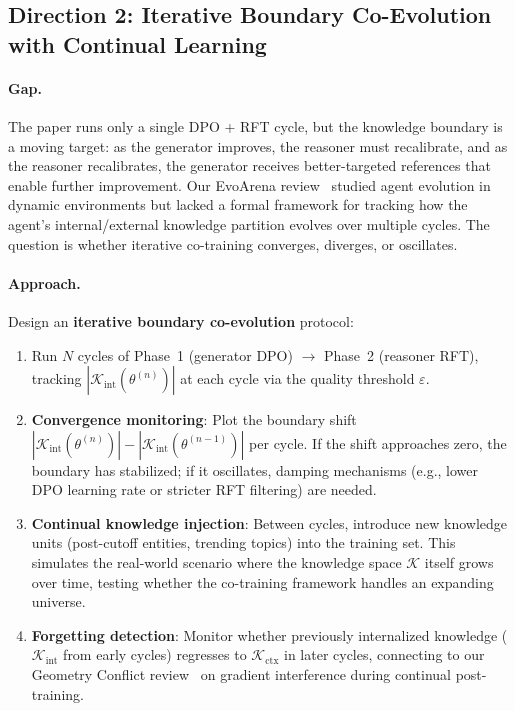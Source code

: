 \documentclass[11pt,a4paper]{article}
\begin{document}
\subsection{Direction 2: Iterative Boundary Co-Evolution with Continual Learning}

\paragraph{Gap.} The paper runs only a single DPO + RFT cycle, but the knowledge boundary is a moving target: as the generator improves, the reasoner must recalibrate, and as the reasoner recalibrates, the generator receives better-targeted references that enable further improvement. Our EvoArena review~\cite{evoarena2026} studied agent evolution in dynamic environments but lacked a formal framework for tracking how the agent's internal/external knowledge partition evolves over multiple cycles. The question is whether iterative co-training converges, diverges, or oscillates.

\paragraph{Approach.} Design an \textbf{iterative boundary co-evolution} protocol:
\begin{enumerate}
\item Run $N$ cycles of Phase~1 (generator DPO) $\to$ Phase~2 (reasoner RFT), tracking $|\mathcal{K}_{\mathrm{int}}(\theta^{(n)})|$ at each cycle via the quality threshold $\varepsilon$.
\item \textbf{Convergence monitoring}: Plot the boundary shift $|\mathcal{K}_{\mathrm{int}}(\theta^{(n)})| - |\mathcal{K}_{\mathrm{int}}(\theta^{(n-1)})|$ per cycle. If the shift approaches zero, the boundary has stabilized; if it oscillates, damping mechanisms (e.g., lower DPO learning rate or stricter RFT filtering) are needed.
\item \textbf{Continual knowledge injection}: Between cycles, introduce new knowledge units (post-cutoff entities, trending topics) into the training set. This simulates the real-world scenario where the knowledge space $\mathcal{K}$ itself grows over time, testing whether the co-training framework handles an expanding universe.
\item \textbf{Forgetting detection}: Monitor whether previously internalized knowledge ($\mathcal{K}_{\mathrm{int}}$ from early cycles) regresses to $\mathcal{K}_{\mathrm{ctx}}$ in later cycles, connecting to our Geometry Conflict review~\cite{geomconflict2026} on gradient interference during continual post-training.
\end{enumerate}
\end{document}
